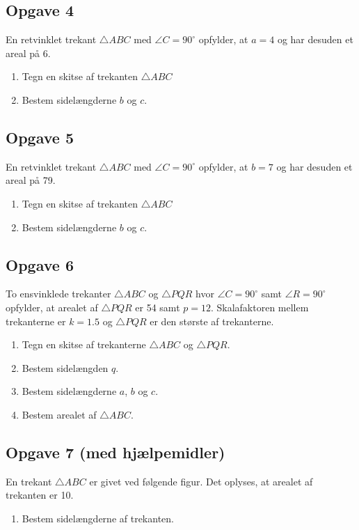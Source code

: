 \subsection*{Opgave 4}

En retvinklet trekant $\triangle ABC$ med $\angle C = 90^\circ$ opfylder, at $a = 4$ og har desuden et areal på 6.
\begin{enumerate}[label=\roman*)]
	\item Tegn en skitse af trekanten $\triangle ABC$
	\item Bestem sidelængderne $b$ og $c$. 
\end{enumerate}

\subsection*{Opgave 5}
En retvinklet trekant $\triangle ABC$ med $\angle C = 90^\circ$ opfylder, at $b = 7$ og har desuden et areal på 79.
\begin{enumerate}[label=\roman*)]
	\item Tegn en skitse af trekanten $\triangle ABC$
	\item Bestem sidelængderne $b$ og $c$. 
\end{enumerate}

\subsection*{Opgave 6}
To ensvinklede trekanter $\triangle ABC$ og $\triangle PQR$ hvor $\angle C = 90^\circ$ samt $\angle R = 90^\circ$ opfylder, at arealet af $\triangle PQR$ er 54 samt $p = 12$. Skalafaktoren mellem trekanterne er $k = 1.5$ og $\triangle PQR$ er den største af trekanterne. 
\begin{enumerate}[label=\roman*)]
	\item Tegn en skitse af trekanterne $\triangle ABC$ og $\triangle PQR$. 
	\item Bestem sidelængden $q$. 
	\item Bestem sidelængderne $a$, $b$ og $c$. 
	\item Bestem arealet af $\triangle ABC$. 
\end{enumerate}

\newpage
\subsection*{Opgave 7 (med hjælpemidler)}

En trekant $\triangle ABC$ er givet ved følgende figur. Det oplyses, at arealet af trekanten er 10.
\begin{center}
\end{center}

\begin{enumerate}[label=\roman*)]
	\item Bestem sidelængderne af trekanten.
\end{enumerate}
